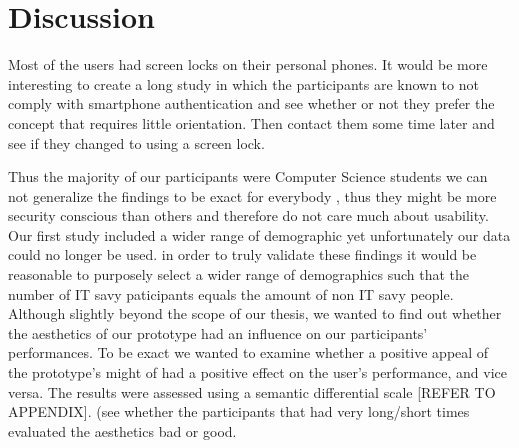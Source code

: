 
\chapter{Discussion}\label{ch:sixth}

Most of the users had screen locks on their personal phones. It would be more interesting to create a long study in which the participants are known to not comply with smartphone authentication and see whether or not they prefer the concept that requires little orientation. Then contact them some time later and see if they changed to using a screen lock.


Thus the majority of our participants were Computer Science students we can not generalize the findings to be exact for everybody , thus they might be more security conscious than others and therefore do not care much about usability. Our first study included a wider range of demographic yet unfortunately our data could no longer be used. in order to truly validate these findings it would be reasonable to purposely select a wider range of demographics such that the number of IT savy paticipants equals the amount of non IT savy people.  \\


Although slightly beyond the scope of our thesis, we wanted to find out whether the aesthetics of our prototype had an influence on our participants' performances. To be exact we wanted to examine whether a positive appeal of the prototype's might of had a positive effect on the user's performance, and vice versa. The results were assessed using a semantic differential scale [REFER TO APPENDIX]. (see whether the participants that had very long/short times evaluated the aesthetics bad or good.  


